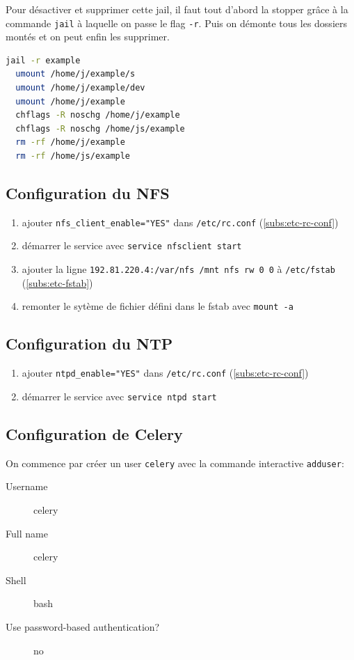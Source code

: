 \documentclass[10pt,a4paper]{article}
\begin{document}
Pour désactiver et supprimer cette jail, il faut tout d'abord la stopper grâce à la commande \texttt{jail} à laquelle on passe le flag \texttt{-r}.
Puis on démonte tous les dossiers montés et on peut enfin les supprimer.
\begin{lstlisting}[language=bash]
  jail -r example
  umount /home/j/example/s
  umount /home/j/example/dev
  umount /home/j/example
  chflags -R noschg /home/j/example
  chflags -R noschg /home/js/example
  rm -rf /home/j/example
  rm -rf /home/js/example
\end{lstlisting}

\subsection{Configuration du NFS}
\begin{enumerate}
  \item ajouter \texttt{nfs\_client\_enable="YES"} dans \texttt{/etc/rc.conf} (\ref{subs:etc-rc-conf})
  \item démarrer le service avec \texttt{service nfsclient start}
  \item ajouter la ligne \texttt{192.81.220.4:/var/nfs        /mnt        nfs        rw        0        0} à \texttt{/etc/fstab} (\ref{subs:etc-fstab})
  \item remonter le sytème de fichier défini dans le fstab avec \texttt{mount -a}
\end{enumerate}

\subsection{Configuration du NTP}
\begin{enumerate}
  \item ajouter \texttt{ntpd\_enable="YES"} dans \texttt{/etc/rc.conf} (\ref{subs:etc-rc-conf})
  \item démarrer le service avec \texttt{service ntpd start}
\end{enumerate}

\subsection{Configuration de Celery}
On commence par créer un user \texttt{celery} avec la commande interactive \texttt{adduser}:
\begin{description}
  \item[Username] celery
  \item[Full name] celery
  \item[Shell] bash
  \item[Use password-based authentication?] no
\end{description}
\end{document}
